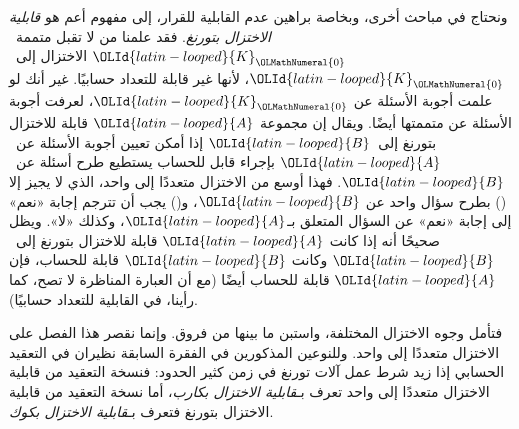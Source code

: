 \documentclass[../../../include/open-logic-section]{subfiles}
\begin{document}
\begin{digress}
ونحتاج في مباحث أخرى، وبخاصة براهين عدم القابلية للقرار، إلى مفهوم
أعم هو \emph{قابلية الاختزال بتورنغ}. فقد علمنا من
 لا تقبل متممة~$\OLId{latin-looped}{K}_\OLMathNumeral{0}$ الاختزال إلى~$\OLId{latin-looped}{K}_\OLMathNumeral{0}$، لأنها
غير قابلة للتعداد حسابيًا. غير أنك لو علمت أجوبة الأسئلة عن
$\OLId{latin-looped}{K}_\OLMathNumeral{0}$، لعرفت أجوبة الأسئلة عن متممتها أيضًا. ويقال إن مجموعة $\OLId{latin-looped}{A}$
قابلة للاختزال بتورنغ إلى~$\OLId{latin-looped}{B}$ إذا أمكن تعيين أجوبة الأسئلة عن~$\OLId{latin-looped}{A}$
بإجراء قابل للحساب يستطيع طرح أسئلة عن~$\OLId{latin-looped}{B}$. فهذا أوسع من
الاختزال متعددًا إلى واحد، الذي لا يجيز إلا () بطرح سؤال
واحد عن $\OLId{latin-looped}{B}$، و() يجب أن تترجم إجابة «نعم» إلى إجابة «نعم» عن السؤال
المتعلق بـ$\OLId{latin-looped}{A}$، وكذلك «لا». ويظل صحيحًا أنه إذا كانت $\OLId{latin-looped}{A}$ قابلة للاختزال
بتورنغ إلى~$\OLId{latin-looped}{B}$ وكانت $\OLId{latin-looped}{B}$ قابلة للحساب، فإن $\OLId{latin-looped}{A}$ قابلة للحساب أيضًا
(مع أن العبارة المناظرة لا تصح، كما رأينا، في القابلية للتعداد حسابيًا).

فتأمل وجوه الاختزال المختلفة، واستبن ما بينها من
فروق. وإنما نقصر هذا الفصل على الاختزال
متعددًا إلى واحد. وللنوعين المذكورين في الفقرة
السابقة نظيران في التعقيد الحسابي إذا زيد شرط عمل
آلات تورنغ في زمن كثير الحدود: فنسخة التعقيد من قابلية الاختزال متعددًا
إلى واحد تعرف بـ\emph{قابلية الاختزال بكارب}، أما نسخة التعقيد من
قابلية الاختزال بتورنغ فتعرف بـ\emph{قابلية الاختزال بكوك}.
\end{digress}
\end{document}
